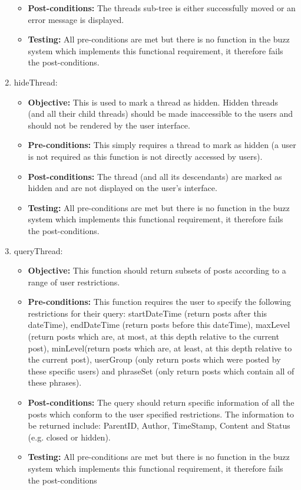 \begin{enumerate}
\begin{itemize}
		\item\textbf{Post-conditions: }The threads sub-tree is either successfully moved or an error message is displayed.
		\item\textbf{Testing: } All pre-conditions are met but there is no function in the buzz system which implements this functional requirement, it therefore fails the post-conditions.
	\end{itemize}
\item hideThread:
	\begin{itemize}
		\item\textbf{Objective: } This is used to mark a thread as hidden. Hidden threads (and all their child threads) should be made inaccessible  to the users and should not be rendered by the user interface.
		\item\textbf{Pre-conditions: } This simply requires a thread to mark as hidden (a user is not required as this function is not directly accessed by users).
		\item\textbf{Post-conditions: }The thread (and all its descendants) are marked as hidden and are not displayed on the user's interface.
		\item\textbf{Testing: }  All pre-conditions are met but there is no function in the buzz system which implements this functional requirement, it therefore fails the post-conditions.
	\end{itemize}
\item queryThread:
	\begin{itemize}
		\item\textbf{Objective: } This function should return subsets of posts  according to a range of user restrictions.
		\item\textbf{Pre-conditions: }  This function requires  the user to specify the following restrictions for their query: startDateTime (return posts after this dateTime), endDateTime (return posts before this dateTime), maxLevel (return posts which are, at most, at this depth relative to the current post), minLevel(return posts which are, at least, at this depth relative to the current post), userGroup (only return posts which were posted by these specific users) and phraseSet (only return posts which contain all of these phrases).
		\item\textbf{Post-conditions: }The query should return specific information of all the posts which conform to the user specified restrictions. The information to be returned include: ParentID, Author, TimeStamp, Content and Status (e.g. closed or hidden).
		\item\textbf{Testing: } All pre-conditions are met but there is no function in the buzz system which implements this functional requirement, it therefore fails the post-conditions
	\end{itemize}
\end{enumerate}
